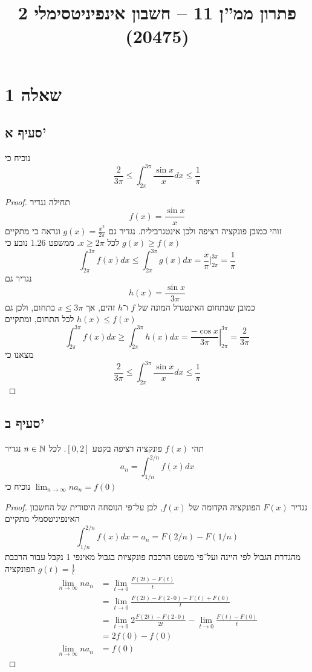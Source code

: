 
\title{פתרון ממ''ן 11 – חשבון אינפיניטסימלי 2 (20475)}


\maketitle
\maketitleprint{}
\section{שאלה 1}
\subsection{סעיף א'}
נוכיח כי
\[
	\frac{2}{3\pi} \le \int_{2\pi}^{3\pi} \frac{\sin x}{x} dx \le \frac{1}{\pi}
\]
\begin{proof}
	תחילה נגדיר
	\[
		f(x) = \frac{\sin x}{x}
	\]
	זוהי כמובן פונקציה רציפה ולכן אינטגרבילית.
	נגדיר גם $g(x) = \frac{x^2}{2\pi}$ ונראה כי מתקיים $g(x) \ge f(x)$ לכל $x \ge 2\pi$.
	ממשפט 1.26 נובע כי
	\[
		\int_{2\pi}^{3\pi} f(x) dx \le \int_{2\pi}^{3\pi} g(x) dx = \frac{x}{\pi} \Big|_{2\pi}^{3\pi} = \frac{1}{\pi}
	\]
	נגדיר גם
	\[
		h(x) = \frac{\sin x}{3 \pi}
	\]
	כמובן שבתחום האינטגרל המונה של $f$ ו־$h$ זהים, אך $x \le 3\pi$ בתחום, ולכן גם $h(x) \le f(x)$ לכל התחום, ומתקיים
	\[
		\int_{2\pi}^{3\pi} f(x) dx \ge \int_{2\pi}^{3\pi} h(x) dx = \left. \frac{-\cos x}{3\pi} \right|_{2\pi}^{3\pi} = \frac{2}{3\pi}
	\]
	מצאנו כי
	\[
		\frac{2}{3\pi} \le \int_{2\pi}^{3\pi} \frac{\sin x}{x} dx \le \frac{1}{\pi}
	\]
\end{proof}

\subsection{סעיף ב'}
תהי $f(x)$ פונקציה רציפה בקטע $[0, 2]$. לכל $n \in \mathbb{N}$ נגדיר
\[
	a_n = \int_{1/n}^{2/n} f(x) dx
\]
נוכיח כי $\lim_{n \to \infty} n a_n = f(0)$
\begin{proof}
	נגדיר $F(x)$ הפונקציה הקדומה של $f(x)$, לכן על־פי הנוסחה היסודית של החשבון האינפיניטסמלי מתקיים
	\[
		\int_{1/n}^{2/n} f(x) dx = a_n = F(2/n) - F(1/n)
	\]
	מהגדרת הגבול לפי היינה ועל־פי משפט הרכבת פונקציות בגבול מאינפי 1 נקבל עבור הרכבת הפונקציה $g(t) = \frac{1}{t}$
	\begin{align*}
		\lim_{n \to \infty} n a_n
		& = \lim_{t \to 0} \frac{F(2t) - F(t)}{t} \\
		& = \lim_{t \to 0} \frac{F(2t) - F(2 \cdot 0) - F(t) + F(0)}{t} \\
		& = \lim_{t \to 0} 2\frac{F(2t) - F(2 \cdot 0)}{2t} - \lim_{t \to 0} \frac{F(t) - F(0)}{t} \\
		& = 2 f(0) - f(0) \\ 
		\lim_{n \to \infty} n a_n
		& = f(0)
	\end{align*}
\end{proof}

